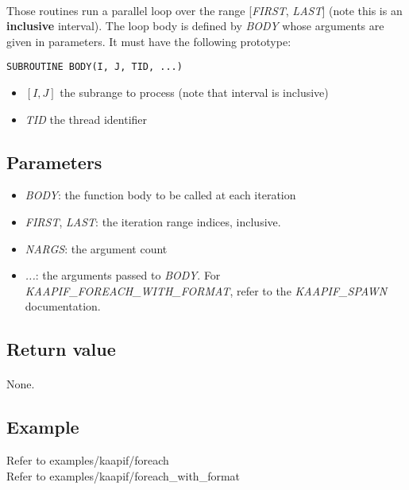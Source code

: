 \documentclass[a4paper, 11pt]{article}
\begin{document}
\paragraph{}
Those routines run a parallel loop over the range [\textit{FIRST}, \textit{LAST}]
(note this is an \textbf{inclusive} interval).
The loop body is defined by \textit{BODY} whose arguments are given
in parameters. It must have the following prototype:\\
\begin{small}
\lstset{language=C}
\begin{lstlisting}[frame=tb]
SUBROUTINE BODY(I, J, TID, ...)
\end{lstlisting}
\end{small}
\begin{itemize}
\item $[I, J]$ the subrange to process (note that interval is inclusive)
\item \textit{TID} the thread identifier
\end{itemize}

\subsection{Parameters}
\begin{itemize}
\item \textit{BODY}: the function body to be called at each iteration
\item \textit{FIRST}, \textit{LAST}: the iteration range indices, inclusive.
\item \textit{NARGS}: the argument count
\item \textit{...}: the arguments passed to \textit{BODY}. For
\textit{KAAPIF\_FOREACH\_WITH\_FORMAT}, refer to the \textit{KAAPIF\_SPAWN}
documentation.
\end{itemize}

\subsection{Return value}
\paragraph{}
None.

\subsection{Example}
Refer to examples/kaapif/foreach\\
Refer to examples/kaapif/foreach\_with\_format
\end{document}

